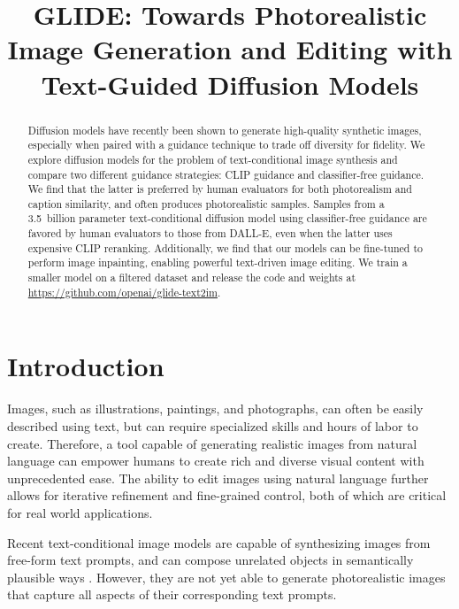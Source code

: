 \title{GLIDE: Towards Photorealistic Image Generation and Editing with Text-Guided Diffusion Models}

\begin{abstract}
Diffusion models have recently been shown to generate high-quality synthetic images, especially when paired with a guidance technique to trade off diversity for fidelity. We explore diffusion models for the problem of text-conditional image synthesis and compare two different guidance strategies: CLIP guidance and classifier-free guidance. We find that the latter is preferred by human evaluators for both photorealism and caption similarity, and often produces photorealistic samples. Samples from a 3.5~billion parameter text-conditional diffusion model using classifier-free guidance are favored by human evaluators to those from DALL-E, even when the latter uses expensive CLIP reranking. Additionally, we find that our models can be fine-tuned to perform image inpainting, enabling powerful text-driven image editing. We train a smaller model on a filtered dataset and release the code and weights at \href{https://github.com/openai/glide-text2im}{https://github.com/openai/glide-text2im}.
\end{abstract}

\section{Introduction}
\label{sec:introduction}

\xdef\@thefnmark{}

Images, such as illustrations, paintings, and photographs, can often be easily described using text, but can require specialized skills and hours of labor to create. Therefore, a tool capable of generating realistic images from natural language can empower humans to create rich and diverse visual content with unprecedented ease. The ability to edit images using natural language further allows for iterative refinement and fine-grained control, both of which are critical for real world applications.

Recent text-conditional image models are capable of synthesizing images from free-form text prompts, and can compose unrelated objects in semantically plausible ways \citep{attngan,dmgan,dfgan,dalle,xmcgan}. However, they are not yet able to generate photorealistic images that capture all aspects of their corresponding text prompts.

